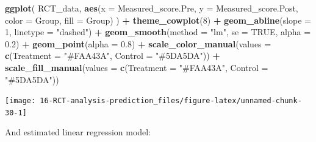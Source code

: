 \documentclass[
]{book}
\newenvironment{Shaded}{\begin{snugshade}}{\end{snugshade}}
\newcommand{\DataTypeTok}[1]{\textcolor[rgb]{0.13,0.29,0.53}{#1}}
\newcommand{\DecValTok}[1]{\textcolor[rgb]{0.00,0.00,0.81}{#1}}
\newcommand{\FloatTok}[1]{\textcolor[rgb]{0.00,0.00,0.81}{#1}}
\newcommand{\KeywordTok}[1]{\textcolor[rgb]{0.13,0.29,0.53}{\textbf{#1}}}
\newcommand{\NormalTok}[1]{#1}
\newcommand{\OperatorTok}[1]{\textcolor[rgb]{0.81,0.36,0.00}{\textbf{#1}}}
\newcommand{\OtherTok}[1]{\textcolor[rgb]{0.56,0.35,0.01}{#1}}
\newcommand{\StringTok}[1]{\textcolor[rgb]{0.31,0.60,0.02}{#1}}
\begin{document}
\begin{Shaded}
\begin{Highlighting}[]
\KeywordTok{ggplot}\NormalTok{(}
\NormalTok{  RCT\_data,}
  \KeywordTok{aes}\NormalTok{(}\DataTypeTok{x =}\NormalTok{ Measured\_score.Pre, }\DataTypeTok{y =}\NormalTok{ Measured\_score.Post, }\DataTypeTok{color =}\NormalTok{ Group, }\DataTypeTok{fill =}\NormalTok{ Group)}
\NormalTok{) }\OperatorTok{+}
\StringTok{  }\KeywordTok{theme\_cowplot}\NormalTok{(}\DecValTok{8}\NormalTok{) }\OperatorTok{+}
\StringTok{  }\KeywordTok{geom\_abline}\NormalTok{(}\DataTypeTok{slope =} \DecValTok{1}\NormalTok{, }\DataTypeTok{linetype =} \StringTok{"dashed"}\NormalTok{) }\OperatorTok{+}
\StringTok{  }\KeywordTok{geom\_smooth}\NormalTok{(}\DataTypeTok{method =} \StringTok{"lm"}\NormalTok{, }\DataTypeTok{se =} \OtherTok{TRUE}\NormalTok{, }\DataTypeTok{alpha =} \FloatTok{0.2}\NormalTok{) }\OperatorTok{+}
\StringTok{  }\KeywordTok{geom\_point}\NormalTok{(}\DataTypeTok{alpha =} \FloatTok{0.8}\NormalTok{) }\OperatorTok{+}
\StringTok{  }\KeywordTok{scale\_color\_manual}\NormalTok{(}\DataTypeTok{values =} \KeywordTok{c}\NormalTok{(}\DataTypeTok{Treatment =} \StringTok{"\#FAA43A"}\NormalTok{, }\DataTypeTok{Control =} \StringTok{"\#5DA5DA"}\NormalTok{)) }\OperatorTok{+}
\StringTok{  }\KeywordTok{scale\_fill\_manual}\NormalTok{(}\DataTypeTok{values =} \KeywordTok{c}\NormalTok{(}\DataTypeTok{Treatment =} \StringTok{"\#FAA43A"}\NormalTok{, }\DataTypeTok{Control =} \StringTok{"\#5DA5DA"}\NormalTok{))}
\end{Highlighting}
\end{Shaded}

\begin{center}\texttt{[image: 16-RCT-analysis-prediction\_files/figure-latex/unnamed-chunk-30-1]} \end{center}

And estimated linear regression model:
\end{document}
